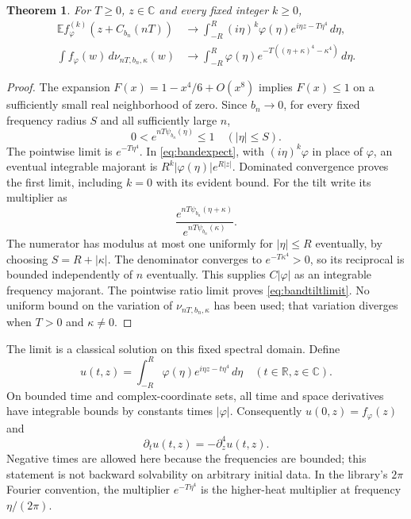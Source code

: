 \documentclass[11pt]{article}
\newtheorem{theorem}{Theorem}[section]
\newcommand{\C}{\mathbb C}\newcommand{\R}{\mathbb R}
\newcommand{\E}{\mathbb E}\newcommand{\Pp}{\mathbb P}
\begin{document}
\begin{theorem}\label{thm:bandlimit}
For $T\geq0$, $z\in\C$ and every fixed integer $k\geq0$,
\begin{align}
 \E f_\varphi^{(k)}(z+C_{b_n}(nT))&\longrightarrow
 \int_{-R}^R(i\eta)^k\varphi(\eta)e^{i\eta z-T\eta^4}\,d\eta,
 \label{eq:bandlimit}\\
 \int f_\varphi(w)\,d\nu_{nT,b_n,\kappa}(w)&\longrightarrow
 \int_{-R}^R\varphi(\eta)e^{-T((\eta+\kappa)^4-\kappa^4)}\,d\eta.
 \label{eq:bandtiltlimit}
\end{align}
\end{theorem}
\begin{proof}
The expansion $F(x)=1-x^4/6+O(x^8)$ implies $F(x)\leq1$
on a sufficiently small real neighborhood of zero. Since $b_n\to0$,
for every fixed frequency radius $S$ and all sufficiently large $n$,
\[
 0<e^{nT\psi_{b_n}(\eta)}\leq1\quad(|\eta|\leq S).
\]
The pointwise limit is $e^{-T\eta^4}$. In
\eqref{eq:bandexpect}, with $(i\eta)^k\varphi$ in place of $\varphi$,
an eventual integrable majorant is
$R^k|\varphi(\eta)|e^{R|z|}$. Dominated convergence proves the first
limit, including $k=0$ with its evident bound.
For the tilt write its multiplier as
\[
 \frac{e^{nT\psi_{b_n}(\eta+\kappa)}}
 {e^{nT\psi_{b_n}(\kappa)}}.
\]
The numerator has modulus at most one uniformly for $|\eta|\leq R$
eventually, by choosing $S=R+|\kappa|$. The denominator converges to
$e^{-T\kappa^4}>0$, so its reciprocal is bounded independently of $n$
eventually. This supplies $C|\varphi|$ as an integrable frequency
majorant. The pointwise ratio limit proves \eqref{eq:bandtiltlimit}.
No uniform bound on the variation of $\nu_{nT,b_n,\kappa}$ has been used;
that variation diverges when $T>0$ and $\kappa\ne0$.
\end{proof}

The limit is a classical solution on this fixed spectral domain. Define
\[
 u(t,z)=\int_{-R}^R\varphi(\eta)e^{i\eta z-t\eta^4}\,d\eta
 \quad(t\in\R,z\in\C).
\]
On bounded time and complex-coordinate sets, all time and space
derivatives have integrable bounds by constants times $|\varphi|$.
Consequently $u(0,z)=f_\varphi(z)$ and
\[
 \partial_tu(t,z)=-\partial_z^4u(t,z).
\]
Negative times are allowed here because the frequencies are bounded;
this statement is not backward solvability on arbitrary initial data.
In the library's $2\pi$ Fourier convention, the multiplier
$e^{-T\eta^4}$ is the higher-heat multiplier at frequency $\eta/(2\pi)$.
\end{document}
